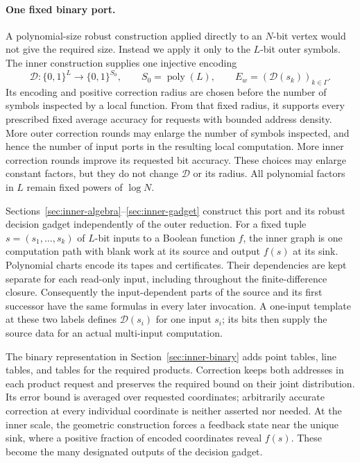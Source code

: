 \paragraph{One fixed binary port.}
A polynomial-size robust construction applied directly to an $N$-bit
vertex would not give the required size. Instead we apply it only to
the $L$-bit outer symbols. The inner construction supplies one injective
encoding
\[
 \mathcal D:\{0,1\}^L\longrightarrow\{0,1\}^{S_0},
 \qquad S_0=\operatorname{poly}(L),
 \qquad E_w=(\mathcal D(s_k))_{k\in\Gamma}.
\]
Its encoding and positive correction radius are chosen before the
number of symbols inspected by a local function. From that fixed radius,
it supports every prescribed fixed average accuracy for requests with
bounded address density. More outer correction rounds may enlarge the number
of symbols inspected, and hence the number of input ports in the resulting
local computation. More inner correction rounds improve its requested
bit accuracy. These choices may enlarge constant factors, but they do
not change $\mathcal D$ or its radius. All polynomial factors in $L$
remain fixed powers of $\log N$.

Sections~\ref{sec:inner-algebra}--\ref{sec:inner-gadget} construct this
port and its robust decision gadget independently of the outer
reduction. For a fixed tuple $s=(s_1,\ldots,s_k)$ of $L$-bit inputs
to a Boolean function $f$, the inner graph is one computation path with
blank work at its source and output $f(s)$ at its sink. Polynomial charts encode its tapes and
certificates. Their dependencies are kept separate for each read-only
input, including throughout the finite-difference closure. Consequently
the input-dependent parts of the source and its first successor have
the same formulas in every later invocation. A one-input template at
these two labels defines $\mathcal D(s_i)$ for one input $s_i$; its bits then supply the
source data for an actual multi-input computation.

The binary representation in Section~\ref{sec:inner-binary} adds
point tables, line tables, and tables for the required products.
Correction keeps both addresses in each product request and preserves
the required bound on their joint distribution. Its error bound is averaged over requested coordinates;
arbitrarily accurate correction at every individual coordinate is
neither asserted nor needed. At the inner scale, the geometric
construction forces a feedback state near the unique sink, where a
positive fraction of encoded coordinates reveal $f(s)$. These become the
many designated outputs of the decision gadget.

